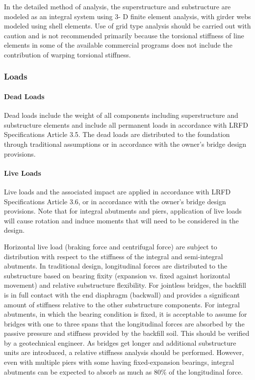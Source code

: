 In the detailed method of analysis, the superstructure and substructure are modeled as an integral system using 3-
D finite element analysis, with girder webs modeled using shell elements. Use of grid type analysis should be carried
out with caution and is not recommended primarily because the torsional stiffness of line elements in some of the
available commercial programs does not include the contribution of warping torsional stiffness.

\subsubsection{Loads}
\paragraph{Dead Loads}
Dead loads include the weight of all components including superstructure and substructure elements and include
all permanent loads in accordance with LRFD Specifications Article 3.5. The dead loads are distributed to the
foundation through traditional assumptions or in accordance with the owner’s bridge design provisions.

\paragraph{Live Loads}
Live loads and the associated impact are applied in accordance with LRFD Specifications Article 3.6, or in
accordance with the owner’s bridge design provisions. Note that for integral abutments and piers, application of live
loads will cause rotation and induce moments that will need to be considered in the design.

Horizontal live load (braking force and centrifugal force) are subject to distribution with respect to the stiffness of
the integral and semi-integral abutments. In traditional design, longitudinal forces are distributed to the substructure
based on bearing fixity (expansion vs. fixed against horizontal movement) and relative substructure flexibility. For
jointless bridges, the backfill is in full contact with the end diaphragm (backwall) and provides a significant amount of
stiffness relative to the other substructure components. For integral abutments, in which the bearing condition is fixed, it is acceptable to assume for bridges with one to three spans that the longitudinal forces are absorbed by the
passive pressure and stiffness provided by the backfill soil. This should be verified by a geotechnical engineer. As
bridges get longer and additional substructure units are introduced, a relative stiffness analysis should be performed.
However, even with multiple piers with some having fixed-expansion bearings, integral abutments can be expected to
absorb as much as 80\% of the longitudinal force.


